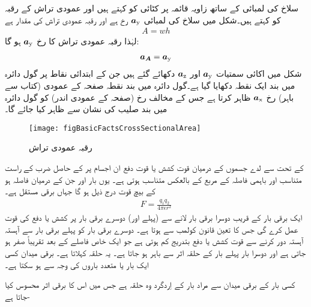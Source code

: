سلاخ  کی لمبائی کے ساتھ زاویہ قائمہ  پر  کٹائی کو  کہتے ہیں اور عمودی تراش کے رقبہ کو  کہتے ہیں۔شکل   میں  سلاخ کی لمبائی   ${\boldsymbol{a}}_{\textup{y}}$  رخ  ہے اور  رقبہ عمودی تراش  کی مقدار  ہے
\begin{align}
A=wh
\end{align}
لہٰذا رقبہ عمودی تراش کا رخ  ${\boldsymbol{a}}_{\textup{y}}$  ہو گا:
\begin{align}
{\ensuremath{{\boldsymbol{a_A}}}}={\boldsymbol{a}}_{\textup{y}}
\end{align}
شکل   میں  اکائی سمتیات  ${\boldsymbol{a}}_{\textup{y}}$  اور  ${\boldsymbol{a}}_{\textup{z}}$ دکھائے گئے ہیں جن کے ابتدائی نقاط پر گول دائرہ میں بند ایک نقطہ دکھایا گیا ہے۔گول دائرہ میں بند نقطہ صفحہ کے عمودی (کتاب سے باہر)  رخ  ${\boldsymbol{a}}_{\textup{x}}$ ظاہر کرتا ہے جس کے مخالف رخ  (صفحہ کے عمودی اندر)  کو گول دائرہ میں بند صلیب کی نشان سے ظاہر کیا جائے گا۔
%
\begin{figure}
\centering
\texttt{[image: figBasicFactsCrossSectionalArea]}
\caption{رقبہ  عمودی تراش}
\label{شکل_حقائق_رقبہ_عمودی}
\end{figure}
%
 کے تحت  سے لدے جسموں کے درمیان قوت کشش یا قوت دفع ان اجسام پر   کے حاصل ضرب کے راست متناسب اور باہمی فاصلہ کے مربع کے بالعکس متناسب ہوتی ہے۔ یوں بار  اور  جن کے درمیان فاصلہ  ہو کے بیچ قوت  درج ذیل ہو گا جہاں  برقی مستقل ہے۔ 
\begin{align}\label{مساوات_بنیادی_کولمب_کا_قانون}
F=\frac{q_1 q_2}{4 \pi \epsilon r^2}
\end{align}
ایک برقی بار کے قریب  دوسرا برقی بار لانے سے  (پہلے اور) دوسرے برقی بار پر کشش یا دفع کی قوت عمل کرے گی جس کا تعین قانون کولمب سے ہوتا ہے۔ دوسرے برقی بار کو پہلے برقی بار سے آہستہ آہستہ دور کرنے سے  قوت کشش یا دفع بتدریج کم ہوتی ہے جو ایک خاص فاصلے کے بعد تقریباً صفر ہو جاتی ہے اور دوسرا بار پہلے بار کے حلقہ اثر سے باہر ہو جاتا ہے۔ یہ حلقہ    کہلاتا ہے۔ برقی میدان کسی ایک بار یا متعدد  باروں کی وجہ سے ہو سکتا ہے۔ 

 کسی بار کے برقی میدان سے مراد بار کے اِردگرد وہ حلقہ ہے جس میں اس کا برقی اثر محسوس کیا جاتا ہے-

